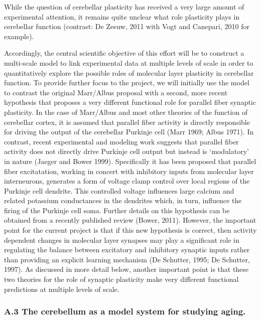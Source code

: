 \documentclass[12pt]{article}
\begin{document}
While the question of cerebellar plasticity has received a very large amount of experimental attention, it remains quite unclear what role plasticity plays in cerebellar function (contrast: De Zeeuw, 2011 with Vogt and Canepari, 2010 for example).

Accordingly, the central scientific objective of this effort will be to construct a multi-scale model to link experimental data at multiple levels of scale in order to quantitatively explore the possible roles of molecular layer plasticity in cerebellar function. To provide further focus to the project, we will initially use the model to contrast the original Marr/Albus proposal with a second, more recent hypothesis that proposes a very different functional role for parallel fiber synaptic plasticity. In the case of Marr/Albus and most other theories of the function of cerebellar cortex, it is assumed that parallel fiber activity is directly responsible for driving the output of the cerebellar Purkinje cell (Marr 1969; Albus 1971). In contrast, recent experimental and modeling work suggests that parallel fiber activity does not directly drive Purkinje cell output but instead is `modulatory' in nature (Jaeger and Bower 1999). Specifically it has been proposed that parallel fiber excitatation, working in concert with inhibitory inputs from molecular layer interneurons, generates a form of voltage clamp control over local regions of the Purkinje cell dendrite. This controlled voltage influences large calcium and related potassium conductances in the dendrites which, in turn, influence the firing of the Purkinje cell soma. Further details on this hypothesis can be obtained from a recently published review (Bower, 2011). However, the important point for the current project is that if this new hypothesis is correct, then activity dependent changes in molecular layer synapses may play a significant role in regulating the balance between excitatory and inhibitory synaptic inputs rather than providing an explicit learning mechanism (De Schutter, 1995; De Schutter, 1997). As discussed in more detail below, another important point is that these two theories for the role of synaptic plasticity make very different functional predictions at multiple levels of scale.\\

\subsubsection*{A.3 The cerebellum as a model system for studying aging.}
\end{document}
